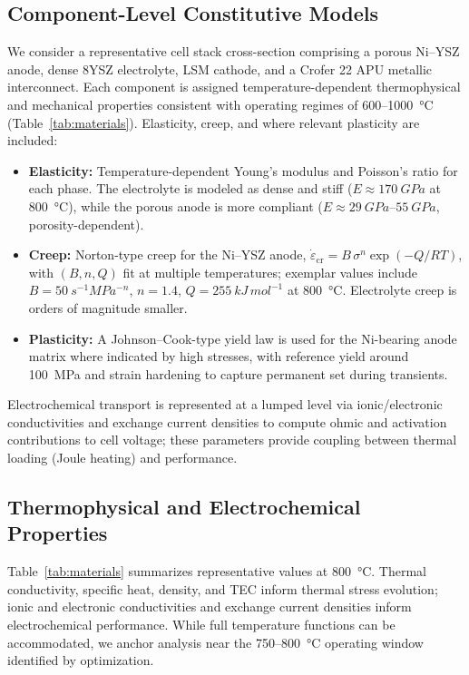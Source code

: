 \documentclass[conference]{IEEEtran}
\begin{document}
\subsection{Component-Level Constitutive Models}
We consider a representative cell stack cross-section comprising a porous Ni–YSZ anode, dense 8YSZ electrolyte, LSM cathode, and a Crofer 22 APU metallic interconnect. Each component is assigned temperature-dependent thermophysical and mechanical properties consistent with operating regimes of \SI{600}{}–\SI{1000}{\celsius} (Table~\ref{tab:materials}). Elasticity, creep, and where relevant plasticity are included:
\begin{itemize}[leftmargin=*]
  \item \textbf{Elasticity:} Temperature-dependent Young’s modulus and Poisson’s ratio for each phase. The electrolyte is modeled as dense and stiff (\(E\approx\SI{170}{GPa}\) at \SI{800}{\celsius}), while the porous anode is more compliant (\(E\approx\SIrange{29}{55}{GPa}\), porosity-dependent).
  \item \textbf{Creep:} Norton-type creep for the Ni–YSZ anode, \(\dot{\varepsilon}_{\mathrm{cr}} = B\,\sigma^{n} \exp(-Q/RT)\), with $(B,n,Q)$ fit at multiple temperatures; exemplar values include $B=\SI{50}{s^{-1}MPa^{-n}}$, $n=1.4$, $Q=\SI{255}{kJ\,mol^{-1}}$ at \SI{800}{\celsius}. Electrolyte creep is orders of magnitude smaller.
  \item \textbf{Plasticity:} A Johnson–Cook-type yield law is used for the Ni-bearing anode matrix where indicated by high stresses, with reference yield around \SI{100}{MPa} and strain hardening to capture permanent set during transients.
\end{itemize}
Electrochemical transport is represented at a lumped level via ionic/electronic conductivities and exchange current densities to compute ohmic and activation contributions to cell voltage; these parameters provide coupling between thermal loading (Joule heating) and performance.

\subsection{Thermophysical and Electrochemical Properties}
Table~\ref{tab:materials} summarizes representative values at \SI{800}{\celsius}. Thermal conductivity, specific heat, density, and TEC inform thermal stress evolution; ionic and electronic conductivities and exchange current densities inform electrochemical performance. While full temperature functions can be accommodated, we anchor analysis near the \SI{750}{}–\SI{800}{\celsius} operating window identified by optimization.
\end{document}
